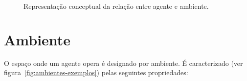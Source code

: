 \begin{figure}[H]
    \begin{center}
    \end{center}
    \caption{Representação conceptual da
    relação entre agente e ambiente.}\label{fig:modelo-agente-ambiente}
\end{figure}


\section{Ambiente}\label{sec:ambiente}

O espaço onde um agente opera é designado por ambiente.
É caracterizado (ver figura~\ref{fig:ambientes-exemplos}) pelas seguintes propriedades:

